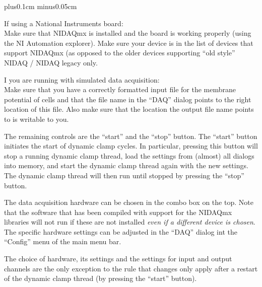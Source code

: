 \documentclass{article}
\makeatletter
\newenvironment{myenum}{
\begin{list}{\labelenumi}{\setlength{\leftmargin}{1.3em}
  \setcounter{enumi}{0}
  \renewcommand{\item}{\addtocounter{enumi}{1}\unskip \vspace{-0.1cm}\@inmatherr\item
  \@ifnextchar [\@item{\@noitemargtrue \@item[\@itemlabel]} \unskip}}
  \itemsep0.1cm plus0.1cm minus0.05cm
  \listparindent0cm
  \setlength{\labelsep}{0.5em}
  \setlength{\labelwidth}{0.8em}}
{\end{list}}
\makeatother
\begin{document}
\begin{myenum}
\addtocounter{enumi}{1}
\item If using a National Instruments board: \\
Make sure that NIDAQmx is installed and the board is working properly
(using the NI Automation explorer). Make sure your device is in the
list of devices that support NIDAQmx (as opposed to the older devices
supporting ``old style'' NIDAQ / NIDAQ legacy only.
\item I you are running with simulated data acquisition: \\
Make sure that you have a correctly formatted input file for the
membrane potential of cells and that the file name in the ``DAQ''
dialog points to the right location of this file. Also make sure that the
location the output file name points to is writable to you.
\end{myenum}

The remaining controls are the ``start'' and the ``stop'' button.  The
``start'' button initiates the start of dynamic clamp cycles. In
particular, pressing this button will stop a running dynamic clamp
thread, load the settings from (almost) all dialogs into memory, and
start the dynamic clamp thread again with the new settings. The
dynamic clamp thread will then run until stopped by pressing the
``stop'' button.

The data acquisition hardware can be chosen in the combo box on the
top. Note that the software that has been compiled with support for
the NIDAQmx libraries will not run if these are not installed {\em
  even if a different device is chosen}. The specific hardware
settings can be adjusted in the ``DAQ'' dialog int the ``Config''
menu of the main menu bar.

The choice of hardware, its settings and the settings for input and
output channels are the only exception to the rule that changes only
apply after a restart of the dynamic clamp thread (by pressing the ``start''
button).
\end{document}
